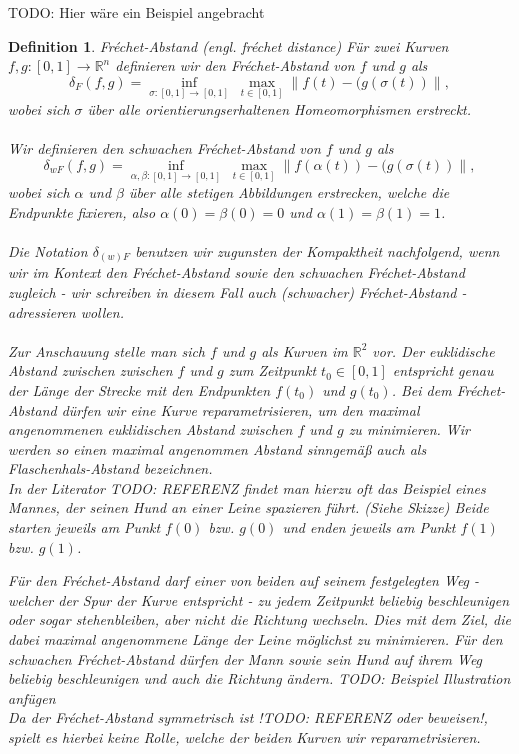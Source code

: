\documentclass[a4paper, 12pt, twoside]{article}
\theoremstyle{Format1} %
\newtheorem{Def}{Definition}[section]       %
\begin{document}
TODO: Hier wäre ein Beispiel angebracht

\begin{Def}
	Fréchet-Abstand (engl. fréchet distance)
	Für zwei Kurven $ f, g: [0,1] \to \mathbb{R}^n $ definieren wir den \textit{Fréchet-Abstand} von $f$ und $g$ als
	$$ \delta_F(f,g) =  \inf_{\sigma:[0,1] \to [0,1]} \; \max_{t \in [0,1]} \lVert f(t)-(g(\sigma(t)) \rVert, $$
	wobei sich $\sigma $ über alle orientierungserhaltenen Homeomorphismen erstreckt.
	\\
	\\
	Wir definieren den \textit{schwachen Fréchet-Abstand} von $f$ und $g$ als
	$$\delta_{wF}(f,g) =\inf_{\alpha , \beta :[0,1] \to [0,1]} \; \max_{t \in [0,1]} \lVert f(\alpha(t))-(g(\sigma(t)) \rVert,$$
	wobei sich $\alpha$ und $\beta$ über alle stetigen Abbildungen erstrecken, welche die Endpunkte fixieren, also $\alpha(0) = \beta(0) = 0$
	und $\alpha(1) = \beta(1) = 1$.
	\\
	\\
	Die Notation $ \delta_{(w)F} $ benutzen wir zugunsten der Kompaktheit nachfolgend, wenn wir im Kontext den Fréchet-Abstand sowie den schwachen Fréchet-Abstand zugleich -
	wir schreiben in diesem Fall auch \textit{(schwacher) Fréchet-Abstand} - adressieren wollen.
	\\
	\\
	Zur Anschauung stelle man sich $f$ und $g$ als Kurven im $\mathbb{R}^2$ vor. Der euklidische Abstand zwischen zwischen $f$ und $g$ zum Zeitpunkt $t_0 \in [0,1]$ entspricht genau der Länge der Strecke
	mit den Endpunkten $f(t_0)$ und $g(t_0)$. Bei dem Fréchet-Abstand dürfen wir eine Kurve reparametrisieren, um den maximal angenommenen euklidischen Abstand zwischen $f$ und $g$ zu minimieren.
	Wir werden so einen maximal angenommen Abstand sinngemäß auch als \textit{Flaschenhals-Abstand} bezeichnen.\\

	In der Literator TODO: REFERENZ findet man hierzu oft das Beispiel eines Mannes, der seinen Hund an einer Leine spazieren führt. (Siehe Skizze)
	Beide starten jeweils am Punkt $f(0)$ bzw. $g(0)$ und enden jeweils am Punkt $f(1)$ bzw. $g(1)$.

	Für den Fréchet-Abstand darf einer von beiden auf seinem festgelegten Weg - welcher der Spur der Kurve entspricht - zu jedem Zeitpunkt beliebig beschleunigen oder sogar stehenbleiben, aber nicht die Richtung wechseln.
	Dies mit dem Ziel, die dabei maximal angenommene Länge der Leine möglichst zu minimieren.
	Für den schwachen Fréchet-Abstand dürfen der Mann sowie sein Hund auf ihrem Weg beliebig beschleunigen und auch die Richtung ändern.
	TODO: Beispiel Illustration anfügen
	\\
	Da der Fréchet-Abstand symmetrisch ist !TODO: REFERENZ oder beweisen!, spielt es hierbei keine Rolle, welche der beiden Kurven wir reparametrisieren.
\end{Def}
\end{document}
